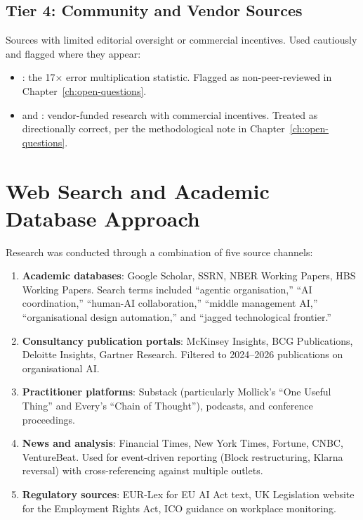 \subsection{Tier 4: Community and Vendor Sources}

Sources with limited editorial oversight or commercial incentives. Used cautiously and flagged where they appear:

\begin{itemize}
  \item \textcite{TDS2026}: the 17$\times$ error multiplication statistic. Flagged as non-peer-reviewed in Chapter~\ref{ch:open-questions}.
  \item \textcite{IBM2025} and \textcite{Gartner2025}: vendor-funded research with commercial incentives. Treated as directionally correct, per the methodological note in Chapter~\ref{ch:open-questions}.
\end{itemize}

\section{Web Search and Academic Database Approach}

Research was conducted through a combination of five source channels:

\begin{enumerate}
  \item \textbf{Academic databases}: Google Scholar, SSRN, NBER Working Papers, HBS Working Papers. Search terms included ``agentic organisation,'' ``AI coordination,'' ``human-AI collaboration,'' ``middle management AI,'' ``organisational design automation,'' and ``jagged technological frontier.''
  \item \textbf{Consultancy publication portals}: McKinsey Insights, BCG Publications, Deloitte Insights, Gartner Research. Filtered to 2024--2026 publications on organisational AI.
  \item \textbf{Practitioner platforms}: Substack (particularly Mollick's ``One Useful Thing'' and Every's ``Chain of Thought''), podcasts, and conference proceedings.
  \item \textbf{News and analysis}: Financial Times, New York Times, Fortune, CNBC, VentureBeat. Used for event-driven reporting (Block restructuring, Klarna reversal) with cross-referencing against multiple outlets.
  \item \textbf{Regulatory sources}: EUR-Lex for EU AI Act text, UK Legislation website for the Employment Rights Act, ICO guidance on workplace monitoring.
\end{enumerate}

